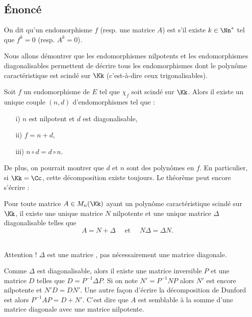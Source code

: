\documentclass[12pt, class=report,crop=false]{standalone}
\begin{document}
\subsection{\'Enoncé}

\begin{definition}
On dit qu'un endomorphisme $f$ (resp. une matrice $A$) 
est  s'il existe $k\in\Nn^*$ tel
que $f^k=0$ (resp. $A^k=0$).
\end{definition} 



Nous allons démontrer que les endomorphismes nilpotents et 
les endomorphismes diagonalisables permettent de décrire tous les 
endomorphismes dont le polynôme caractéristique est scindé sur $\Kk$ (c'est-à-dire ceux trigonalisables). 



\begin{theoreme}
\label{th:dunford1}
Soit $f$ un endomorphisme de $E$ tel que $\chi_f$ soit scindé sur $\Kk$. 
Alors il existe un unique couple $(n,d)$ d'endomorphismes tel que : 
\begin{itemize}
  \item[i)] $n$ est nilpotent et $d$ est diagonalisable,
  \item[ii)] $f=n+d$,
  \item[iii)] $n\circ d=d\circ n$.   
\end{itemize}
\end{theoreme}

De plus, on pourrait montrer que $d$ et $n$ sont des polynômes en $f$.
En particulier, si $\Kk=\Cc$, cette décomposition existe toujours.
Le théorème peut encore s'écrire :

\begin{theoreme}
\label{th:dunford2}
Pour toute matrice $A\in M_n(\Kk)$ ayant un polynôme caractéristique scindé sur $\Kk$, il existe une 
unique matrice $N$ nilpotente et une unique matrice $\Delta$ diagonalisable telles que 
$$A=N+\Delta \quad \text{ et } \quad N\Delta=\Delta N.$$
\end{theoreme} 
 
\bigskip 
 
 \\
Attention ! $\Delta$ est une matrice , pas nécessairement une matrice diagonale.

Comme $\Delta$ est diagonalisable, alors il existe une matrice inversible $P$ et une matrice  $D$ telles que $D = P^{-1}\Delta P$. Si on note $N' = P^{-1}NP$ alors $N'$ est encore nilpotente et $N' D= DN'$. Une autre façon d'écrire la décomposition de Dunford est alors $P^{-1}AP = D + N'$. C'est dire que $A$ est semblable à la somme d'une matrice diagonale avec une matrice nilpotente.
 
\end{document}
